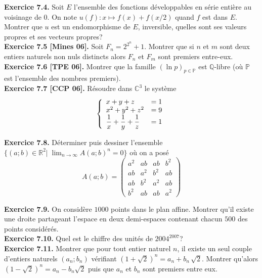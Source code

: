 \documentclass[a4paper,12pt,francais]{article}
\newcommand{\field}[1]{\mathbb{#1}}
\newcommand{\R}{\field{R}}
\newcommand{\Q}{\field{Q}}
\newcommand{\C}{\field{C}}
\begin{document}
\noindent
{\bf Exercice 7.4.} Soit $E$ l'ensemble des fonctions développables en série entière au voisinage de 0. On note $u(f):x\mapsto f(x)+f(x/2)$ quand $f$ est dans $E$. Montrer que $u$ est un endomorphisme de $E$, inversible, quelles sont ses valeurs propres et ses vecteurs propres?\\ 

\noindent
{\bf Exercice 7.5 [Mines 06].} Soit $F_n=2^{2^n}+1$. Montrer que si
$n$ et $m$ sont deux entiers naturels non nuls distincts alors $F_n$
et $F_m$ sont premiers entre-eux.\\ 

\noindent
{\bf Exercice 7.6 [TPE 06].} Montrer que la famille $(\ln p)_{p \in
  \field{P}}$ est $\Q$-libre (où $\field{P}$ est l'ensemble des
  nombres premiers).\\

\noindent
{\bf Exercice 7.7 [CCP 06].} Résoudre dans $\C^3$ le système 
$$\left\{
\begin{array}{lc}
x+y+z&=1\\
x^2+y^2+z^2&=9\\
\displaystyle 
\frac{1}{x}+\frac{1}{y}+\frac{1}{z}&=1\\
\end{array}\\
\right.$$

\noindent
{\bf Exercice 7.8.} Déterminer puis dessiner l'ensemble $\{(a;b)\in \R^2 |\; \lim_{n\to \infty} A(a;b)^n =0\}$ où on a posé
$$A(a;b)=\left( \begin{array}{cccc}
a^2&ab&ab&b^2\\
ab&a^2&b^2&ab\\
ab&b^2&a^2&ab\\
b^2&ab&ab&a^2
\end{array}
\right)$$

\noindent
{\bf Exercice 7.9.} On considère $1000$ points dans le plan affine. Montrer qu'il existe une droite partageant l'espace en deux demi-espaces contenant chacun $500$ des points considérés.\\

\noindent
{\bf Exercice 7.10.} Quel est le chiffre des unités de $2004^{2007}$?\\

\noindent
{\bf Exercice 7.11.} Montrer que pour tout entier naturel $n$, il existe un seul couple d'entiers naturels $(a_n;b_n)$ vérifiant $(1+\sqrt{2})^n=a_n+b_n\, \sqrt{2}$. Montrer qu'alors $(1-\sqrt{2})^n=a_n-b_n \sqrt{2}$ puis que $a_n$ et $b_n$ sont premiers entre eux.\\
\end{document}
